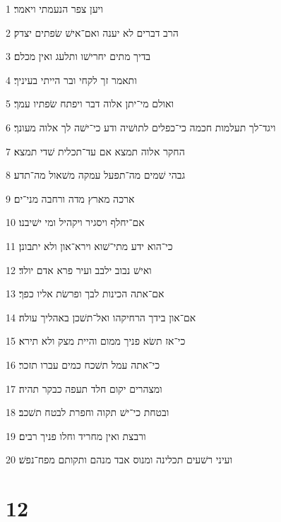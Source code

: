 \par 1 ויען צפר הנעמתי ויאמר׃
\par 2 הרב דברים לא יענה ואם־אישׁ שׂפתים יצדק׃
\par 3 בדיך מתים יחרישׁו ותלעג ואין מכלם׃
\par 4 ותאמר זך לקחי ובר הייתי בעיניך׃
\par 5 ואולם מי־יתן אלוה דבר ויפתח שׂפתיו עמך׃
\par 6 ויגד־לך תעלמות חכמה כי־כפלים לתושׁיה ודע כי־ישׁה לך אלוה מעונך׃
\par 7 החקר אלוה תמצא אם עד־תכלית שׁדי תמצא׃
\par 8 גבהי שׁמים מה־תפעל עמקה משׁאול מה־תדע׃
\par 9 ארכה מארץ מדה ורחבה מני־ים׃
\par 10 אם־יחלף ויסגיר ויקהיל ומי ישׁיבנו׃
\par 11 כי־הוא ידע מתי־שׁוא וירא־און ולא יתבונן׃
\par 12 ואישׁ נבוב ילבב ועיר פרא אדם יולד׃
\par 13 אם־אתה הכינות לבך ופרשׂת אליו כפך׃
\par 14 אם־און בידך הרחיקהו ואל־תשׁכן באהליך עולה׃
\par 15 כי־אז תשׂא פניך ממום והיית מצק ולא תירא׃
\par 16 כי־אתה עמל תשׁכח כמים עברו תזכר׃
\par 17 ומצהרים יקום חלד תעפה כבקר תהיה׃
\par 18 ובטחת כי־ישׁ תקוה וחפרת לבטח תשׁכב׃
\par 19 ורבצת ואין מחריד וחלו פניך רבים׃
\par 20 ועיני רשׁעים תכלינה ומנוס אבד מנהם ותקותם מפח־נפשׁ׃

\chapter{12}

